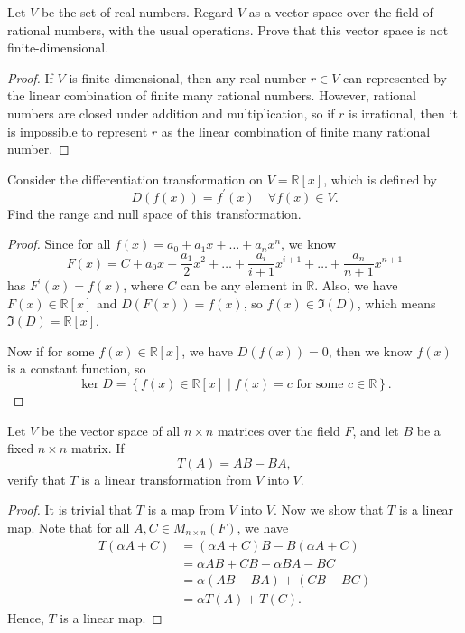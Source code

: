 \begin{problem}
Let \(V\) be the set of real numbers. Regard \(V\) as a vector space over the field of rational numbers, with the usual operations. Prove that this vector space is not finite-dimensional.
\end{problem}
\begin{proof}
    If \(V\) is finite dimensional, then any real number \(r \in V\) can represented by the linear combination of finite many rational numbers. However, rational numbers are closed under addition and multiplication, so if \(r\) is irrational, then it is impossible to represent \(r\) as the linear combination of finite many rational number. 
\end{proof}

\begin{problem}
Consider the differentiation transformation on \(V=\mathbb{R}[x]\), which is defined by 
\[
  D(f(x)) = f^{\prime} (x) \quad \forall f(x) \in V.  
\] 
Find the range and null space of this transformation.
\end{problem}
\begin{proof}
    Since for all \(f(x) = a_0 + a_1 x + \dots + a_n x^n\), we know 
    \[
        F(x) = C + a_0 x + \frac{a_1}{2} x^2 + \dots + \frac{a_i}{i+1}x^{i+1} + \dots + \frac{a_n}{n+1}x^{n+1}
    \] has \(F^{\prime} (x) = f(x)\), where \(C\) can be any element in \(\mathbb{R} \). Also, we have \(F(x) \in \mathbb{R} [x]\) and \(D(F(x))=f(x)\), so \(f(x) \in \Im (D)\), which means \(\Im (D) = \mathbb{R} [x]\).
    
    Now if for some \(f(x) \in \mathbb{R} [x]\), we have \(D(f(x)) = 0\), then we know \(f(x)\) is a constant function, so
    \[
        \ker D = \left\{ f(x) \in \mathbb{R} [x] \mid f(x) = c \text{ for some } c \in \mathbb{R}  \right\}.
    \]   
\end{proof}

\begin{problem}
    Let \(V\) be the vector space of all \(n \times n\) matrices over the field \(F\), and let \(B\) be a fixed \(n \times n\) matrix. If 
    \[
        T(A) = AB-BA,
    \]verify that \(T\) is a linear transformation from \(V\) into \(V\).   
\end{problem}
\begin{proof}
It is trivial that \(T\) is a map from \(V\) into \(V\). Now we show that \(T\) is a linear map. Note that for all \(A, C \in M_{n \times n}(F)\), we have
\begin{align*}
    T(\alpha A + C) &= (\alpha A + C)B - B(\alpha A + C) \\
    &= \alpha AB + CB - \alpha BA - BC \\
    &= \alpha (AB - BA) + (CB - BC) \\
    &= \alpha T(A) + T(C).
\end{align*}   
Hence, \(T\) is a linear map.
\end{proof}


